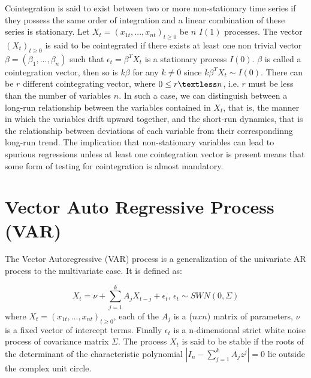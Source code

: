 \documentclass[11pt,a4,twosided,singlespacing,titlepagenumber=on]{scrreprt}
\numberwithin{equation}{chapter} %
\theoremstyle{remark}
\begin{document}
Cointegration is said to exist between two or more non-stationary time series if they possess the same order of integration and a linear combination of these series is stationary. Let $X_t = (x_{1t},...,x_{nt})_{t \geq 0}$ be $n$ $I(1)$ processes. The vector $(X_t)_{t \geq 0}$ is said to be cointegrated if there exists at least one non trivial vector $\beta = (\beta_1,...,\beta_n)$ such that $\epsilon_t = \beta^T X_t$ is a stationary process $I(0)$. $\beta$ is called a cointegration vector, then so is $k \beta$ for any $k \neq 0$ since $k\beta^TX_t \sim I(0)$. There can be $r$ different cointegrating vector, where $0 \leq r \textless n$, i.e. $r$ must be less than the number of variables $n$. In such a case, we can distinguish between a long-run relationship between the variables contained in $X_t$, that is, the manner in which the variables drift upward together, and the short-run dynamics, that is the relationship between deviations of each variable from their correspondinng long-run trend. The implication that non-stationary variables can lead to spurious regressions unless at least one cointegration vector is present means that some form of testing for cointegration is almost mandatory.\\

\section{Vector Auto Regressive Process (VAR)}
The Vector Autoregressive (VAR) process is a generalization of the univariate AR process to the multivariate case. It is defined as:

$$X_t = \nu + \sum_{j=1}^k A_j X_{t-j} + \epsilon_t \text{, } \epsilon_t \sim SWN(0, \Sigma)$$
where $X_t = (x_{1t},...,x_{nt})_{t \geq 0}$, each of the $A_j$ is a ($nxn$) matrix of parameters, $\nu$ is a fixed vector of intercept terms. Finally $\epsilon_t$ is a n-dimensional strict white noise process of covariance matrix $\Sigma$. The process $X_t$ is said to be stable if the roots of the determinant of the characteristic polynomial $|I_n - \sum_{j=1}^k A_j z^j| = 0$ lie outside the complex unit circle.
\end{document}
